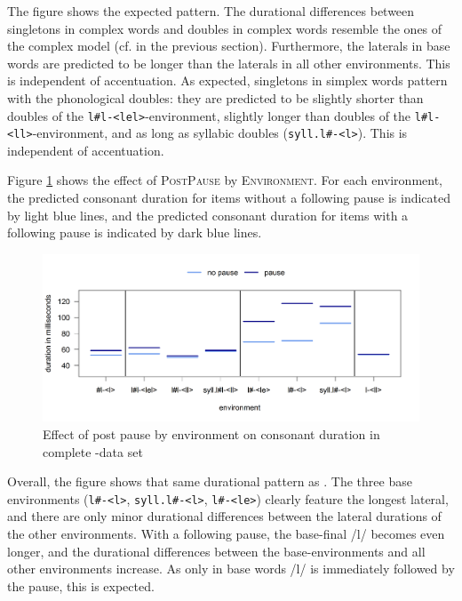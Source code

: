  The figure shows the expected pattern. The durational differences between singletons in complex words and doubles in complex words resemble the ones of the complex model (cf.  in the previous section). 
 Furthermore, the laterals in base words are predicted to be longer than the laterals in all other environments. This is independent of accentuation. 
 As expected, singletons in simplex words pattern with the phonological doubles: they are predicted to be slightly shorter than doubles of the \texttt{l\#l-<lel>}-environment, slightly longer than doubles of the \texttt{l\#l-<ll>}-environment, and as long as syllabic doubles (\texttt{syll.l\#-<l>}). This is independent of accentuation.
 
 
 
 Figure \ref{fig:Env pause lyComplete experiment} shows the effect of \textsc{PostPause} by \textsc{Environment}. For each environment, the predicted consonant duration for items without a following pause is indicated by light blue lines, and the predicted consonant duration for  items with a following pause is indicated by dark blue lines.

 \begin{figure} [h!]
 	\centering

 	\includegraphics [scale=0.48] {images/Experiment/LyModelCompleteInterEnvPauseLines}

 	\caption{Effect of  post pause by environment on consonant duration in complete -data set}
 	\label{fig:Env pause lyComplete experiment}

 \end{figure}
 

 Overall, the figure shows that same durational pattern as . The three base environments (\texttt{l\#-<l>}, \texttt{syll.l\#-<l>}, \texttt{l\#-<le>}) clearly feature the longest lateral, and there are only minor durational differences between the lateral durations of the other environments. 
 With a following pause, the base-final /l/ becomes even longer, and the durational differences between the base-environments and all other environments increase. As only in base words /l/ is immediately followed by the pause, this is expected. 



